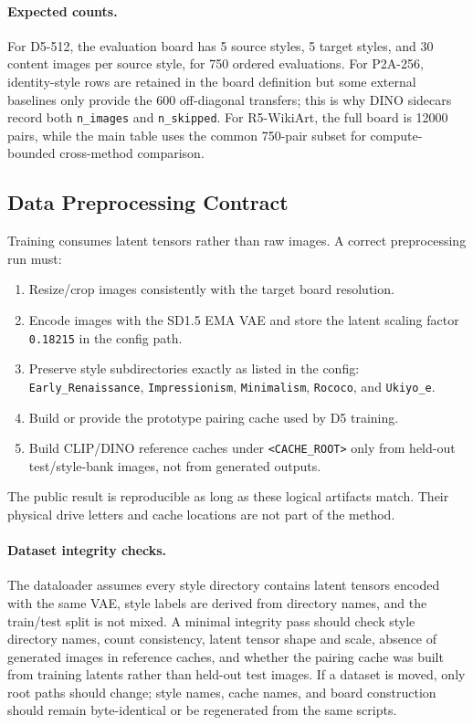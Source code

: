 \documentclass[10pt,twocolumn]{article}
\begin{document}
\paragraph{Expected counts.}
For D5-512, the evaluation board has 5 source styles, 5 target styles, and 30 content
images per source style, for 750 ordered evaluations. For P2A-256, identity-style rows
are retained in the board definition but some external baselines only provide the 600
off-diagonal transfers; this is why DINO sidecars record both \texttt{n\_images} and
\texttt{n\_skipped}. For R5-WikiArt, the full board is 12000 pairs, while the main table
uses the common 750-pair subset for compute-bounded cross-method comparison.

\subsection{Data Preprocessing Contract}

Training consumes latent tensors rather than raw images. A correct preprocessing run must:
\begin{enumerate}[leftmargin=1.6em,itemsep=0.2em]
  \item Resize/crop images consistently with the target board resolution.
  \item Encode images with the SD1.5 EMA VAE and store the latent scaling factor
  \texttt{0.18215} in the config path.
  \item Preserve style subdirectories exactly as listed in the config:
  \texttt{Early\_Renaissance}, \texttt{Impressionism}, \texttt{Minimalism},
  \texttt{Rococo}, and \texttt{Ukiyo\_e}.
  \item Build or provide the prototype pairing cache used by D5 training.
  \item Build CLIP/DINO reference caches under \texttt{<CACHE\_ROOT>} only from held-out
  test/style-bank images, not from generated outputs.
\end{enumerate}

The public result is reproducible as long as these logical artifacts match. Their
physical drive letters and cache locations are not part of the method.

\paragraph{Dataset integrity checks.}
The dataloader assumes every style directory contains latent tensors encoded with the
same VAE, style labels are derived from directory names, and the train/test split is not
mixed. A minimal integrity pass should check style directory names, count consistency,
latent tensor shape and scale, absence of generated images in reference caches, and
whether the pairing cache was built from training latents rather than held-out test
images. If a dataset is moved, only root paths should change; style names, cache names,
and board construction should remain byte-identical or be regenerated from the same
scripts.
\end{document}
